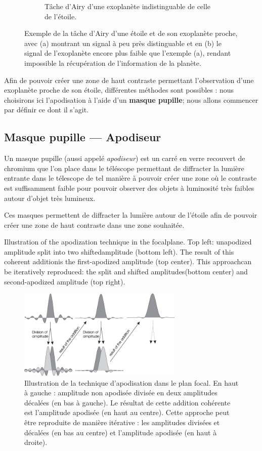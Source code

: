 \begin{figure}[htbp]
\begin{subfigure}[b]{0.45\textwidth}
        \caption{Tâche d'Airy d'une exoplanète indistinguable de celle de l'étoile.}
    \end{subfigure}
    \caption{Exemple de la tâche d'Airy d'une étoile et de son exoplanète proche, avec (a) montrant un signal à peu près distinguable et en (b) le signal de l'exoplanète encore plus faible que l'exemple (a), rendant impossible la récupération de l'information de la planète.}
\end{figure}


Afin de pouvoir créer une zone de haut contraste permettant l'observation d'une exoplanète proche de son étoile, différentes méthodes sont possibles : nous choisirons ici l’apodisation à l’aide d’un \textbf{masque pupille}; nous allons commencer par définir ce dont il s'agit.

\subsection{Masque pupille — Apodiseur}

Un masque pupille (aussi appelé \emph{apodiseur}) est un carré en verre recouvert de chromium que l'on place dans le téléscope permettant de diffracter la lumière entrante dans le télescope de tel manière à pouvoir créer une zone où le contraste est suffisamment faible pour pouvoir observer des objets à luminosité très faibles autour d'objet très lumineux.

Ces masques permettent de diffracter la lumière autour de l’étoile afin de pouvoir créer une zone de haut contraste dans une zone souhaitée.

Illustration of the apodization technique in the focalplane. Top left: unapodized amplitude split into two shiftedamplitude (bottom left). The result of this coherent additionis the ﬁrst-apodized amplitude (top center). This approachcan be iteratively reproduced: the split and shifted amplitudes(bottom center) and second-apodized amplitude (top right).

\begin{figure}[htbp]
    \centering
    \includegraphics[width=0.7\textwidth]{figures/apod_explanation.png}
    \caption{Illustration de la technique d'apodisation dans le plan focal. En haut à gauche : amplitude non apodisée divisée en deux amplitudes décalées (en bas à gauche). Le résultat de cette addition cohérente est l'amplitude apodisée (en haut au centre). Cette approche peut être reproduite de manière itérative : les amplitudes divisées et décalées (en bas au centre) et l'amplitude apodisée (en haut à droite). }%
\end{figure}

